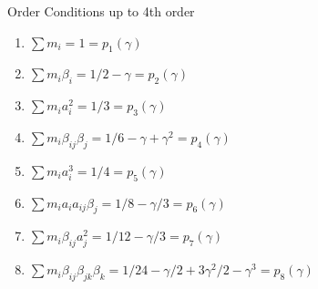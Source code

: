 \documentclass[serif]{beamer}
\begin{document}
\begin{frame}{Order Conditions up to 4th order}
  \begin{enumerate}
  \item<1-> $\sum m_i = 1 = p_1\left(\gamma\right)$
  \vfill
  \item<1-> $\sum m_i\beta_i = 1/2 - \gamma = p_2\left(\gamma\right)$
  \vfill
  \item<1-> $\sum m_ia_i^2 = 1/3 = p_3\left(\gamma\right)$
  \vfill
  \item<1-> $\sum m_i\beta_{ij}\beta_j = 1/6 - \gamma + \gamma^2 = p_4\left(\gamma\right)$
  \vfill
  \item<1-> $\sum m_ia_i^3 = 1/4 = p_5\left(\gamma\right)$
  \vfill
  \item<1-> $\sum m_ia_ia_{ij}\beta_j = 1/8 - \gamma/3 = p_6\left(\gamma\right)$
  \vfill
  \item<1-> $\sum m_i\beta_{ij}a_j^2 = 1/12 - \gamma/3 = p_7\left(\gamma\right)$
  \vfill
  \item<1-> $\sum m_i\beta_{ij}\beta_{jk}\beta_{k} = 1/24 - \gamma/2 + 3\gamma^2/2 - \gamma^3 = p_8\left(\gamma\right)$
  \end{enumerate}
\end{frame}
\end{document}
